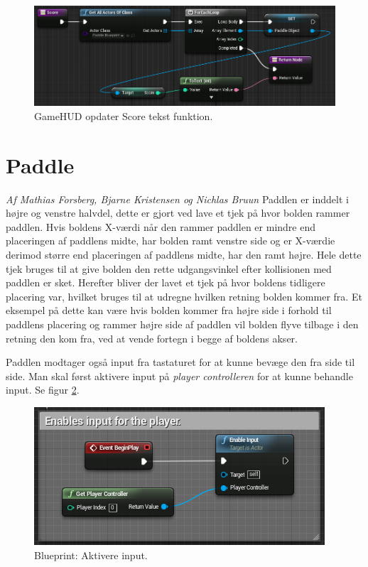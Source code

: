 \begin{figure}
	\begin{center}
		\caption{GameHUD opdater Score tekst funktion.}
		\label{dia:gamehudscorefunction}
		\includegraphics[width=0.98\linewidth]{pictures/blueprints/gamehud-score-function}
	\end{center}
\end{figure}

\section{Paddle}
\textit{Af Mathias Forsberg, Bjarne Kristensen og Nichlas Bruun}\newline
Paddlen er inddelt i højre og venstre halvdel, dette er gjort ved lave et tjek på hvor bolden rammer paddlen. Hvis boldens X-værdi når den rammer paddlen er mindre end placeringen af paddlens midte, har bolden ramt venstre side og er X-værdie derimod større end placeringen af paddlens midte, har den ramt højre. Hele dette tjek bruges til at give bolden den rette udgangsvinkel efter kollisionen med paddlen er sket. Herefter bliver der lavet et tjek på hvor boldens tidligere placering var, hvilket bruges til at udregne hvilken retning bolden kommer fra. Et eksempel på dette kan være hvis bolden kommer fra højre side i forhold til paddlens placering og rammer højre side af paddlen vil bolden flyve tilbage i den retning den kom fra, ved at vende fortegn i begge af boldens akser.

Paddlen modtager også input fra tastaturet for at kunne bevæge den fra side til side. Man skal først aktivere input på \textit{player controlleren} for at kunne behandle input. Se figur \ref{dia:paddleenableinput}. 

\begin{figure}
	\begin{center}
		\caption{Blueprint: Aktivere input.}
		\label{dia:paddleenableinput}
		\includegraphics[width=0.60\linewidth]{pictures/blueprints/paddle-enable-input}
		\end{center}
\end{figure}

